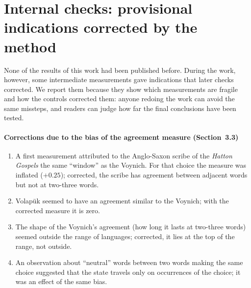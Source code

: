\section{Internal checks: provisional indications corrected by the method}

None of the results of this work had been published before. During the work, however, some intermediate measurements gave
indications that later checks corrected. We report them because they show which measurements are fragile and how the
controls corrected them: anyone redoing the work can avoid the same missteps, and readers can judge how far the final
conclusions have been tested.

\paragraph{Corrections due to the bias of the agreement measure (Section~3.3)}
\begin{enumerate}
\item A first measurement attributed to the Anglo-Saxon scribe of the \emph{Hatton Gospels} the same ``window'' as the
  Voynich. For that choice the measure was inflated ($+0.25$); corrected, the scribe has agreement between adjacent words
  but not at two-three words.
\item Volapük seemed to have an agreement similar to the Voynich; with the corrected measure it is zero.
\item The shape of the Voynich's agreement (how long it lasts at two-three words) seemed outside the range of languages;
  corrected, it lies at the top of the range, not outside.
\item An observation about ``neutral'' words between two words making the same choice suggested that the state travels only
  on occurrences of the choice; it was an effect of the same bias.
\end{enumerate}


